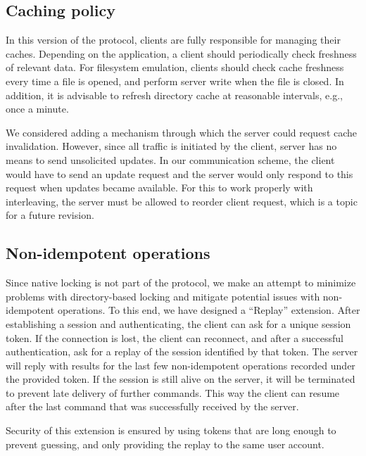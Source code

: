 %

\subsection{Caching policy}

In this version of the protocol, clients are fully responsible for managing their caches.  Depending on the
application, a client should periodically check freshness of relevant data.  For filesystem emulation, clients
should check cache freshness every time a file is opened, and perform server write when the file is closed.
In addition, it is advisable to refresh directory cache at reasonable intervals, e.g., once a minute.

We considered adding a mechanism through which the server could request cache invalidation. However, since all
traffic is initiated by the client, server has no means to send unsolicited updates. In our communication
scheme, the client would have to send an update request and the server would only respond to this request when
updates became available. For this to work properly with interleaving, the server must be allowed to reorder
client request, which is a topic for a future revision.

%

\subsection{Non-idempotent operations}

Since native locking is not part of the protocol, we make an attempt to minimize problems with directory-based
locking and mitigate potential issues with non-idempotent operations. To this end, we have designed
a ``Replay'' extension. After establishing a session and authenticating, the client can ask for a unique
session token. If the connection is lost, the client can reconnect, and after a successful authentication, ask
for a replay of the session identified by that token. The server will reply with results for the last few
non-idempotent operations recorded under the provided token. If the session is still alive on the server, it
will be terminated to prevent late delivery of further commands. This way the client can resume after the last
command that was successfully received by the server.

Security of this extension is ensured by using tokens that are long enough to prevent guessing, and only
providing the replay to the same user account.

